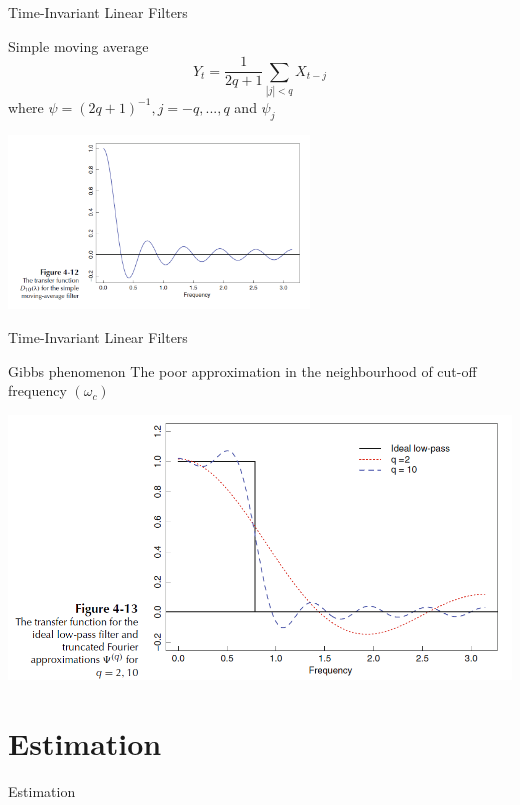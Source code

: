 \documentclass[11pt]{beamer}
\begin{document}
\begin{frame}{Time-Invariant Linear Filters \cite{brockwell2002introduction}}
\begin{exampleblock}{Simple moving average}
\begin{equation*}
Y_{t}=\dfrac{1}{2q+1}\sum_{|j|<q}X_{t-j}
\end{equation*}
where $\psi=(2q+1)^{-1},j=-q,...,q$ and $\psi_{j}$
\end{exampleblock}
    \begin{center}
     \includegraphics[width=0.6\textwidth]{Pic/D_MA.png}
    \end{center}
\end{frame}

\begin{frame}{Time-Invariant Linear Filters \cite{brockwell2002introduction}}
\begin{exampleblock}{Gibbs phenomenon}
The poor approximation in the neighbourhood of cut-off frequency $(\omega_{c})$ 
\end{exampleblock}
    \begin{center}
     \includegraphics[width=\textwidth]{Pic/gibbs_ph.png}
    \end{center}
\end{frame}





\section{Estimation}
\begin{frame}
\begin{center}
\Huge
Estimation
\end{center}
\end{frame}
\end{document}

